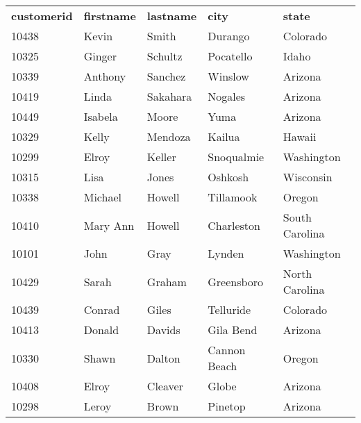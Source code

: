 \begin{tabular}{lllll}
    {\textbf{customerid}} & {\textbf{firstname}} & {\textbf{lastname}} & {\textbf{city}} & {\textbf{state}} \\
    {10438}               & {Kevin}              & {Smith}             & {Durango}       & {Colorado}       \\
    {10325}               & {Ginger}             & {Schultz}           & {Pocatello}     & {Idaho}          \\
    {10339}               & {Anthony}            & {Sanchez}           & {Winslow}       & {Arizona}        \\
    {10419}               & {Linda}              & {Sakahara}          & {Nogales}       & {Arizona}        \\
    {10449}               & {Isabela}            & {Moore}             & {Yuma}          & {Arizona}        \\
    {10329}               & {Kelly}              & {Mendoza}           & {Kailua}        & {Hawaii}         \\
    {10299}               & {Elroy}              & {Keller}            & {Snoqualmie}    & {Washington}     \\
    {10315}               & {Lisa}               & {Jones}             & {Oshkosh}       & {Wisconsin}      \\
    {10338}               & {Michael}            & {Howell}            & {Tillamook}     & {Oregon}         \\
    {10410}               & {Mary Ann}           & {Howell}            & {Charleston}    & {South Carolina} \\
    {10101}               & {John}               & {Gray}              & {Lynden}        & {Washington}     \\
    {10429}               & {Sarah}              & {Graham}            & {Greensboro}    & {North Carolina} \\
    {10439}               & {Conrad}             & {Giles}             & {Telluride}     & {Colorado}       \\
    {10413}               & {Donald}             & {Davids}            & {Gila Bend}     & {Arizona}        \\
    {10330}               & {Shawn}              & {Dalton}            & {Cannon Beach}  & {Oregon}         \\
    {10408}               & {Elroy}              & {Cleaver}           & {Globe}         & {Arizona}        \\
    {10298}               & {Leroy}              & {Brown}             & {Pinetop}       & {Arizona}       
\end{tabular} \\ \\


